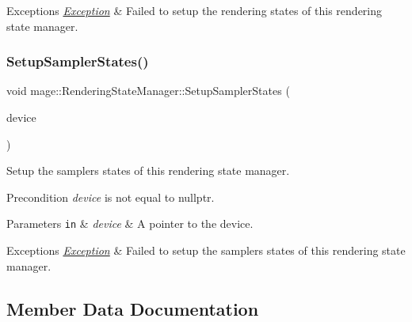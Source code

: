 \begin{DoxyExceptions}{Exceptions}
{\em \hyperlink{classmage_1_1_exception}{Exception}} & Failed to setup the rendering states of this rendering state manager. \\
\hline
\end{DoxyExceptions}
\hypertarget{classmage_1_1_rendering_state_manager_ae567fc70128f8fa58b2ac0b63b0c636f}{}\label{classmage_1_1_rendering_state_manager_ae567fc70128f8fa58b2ac0b63b0c636f} 
\subsubsection{\texorpdfstring{Setup\+Sampler\+States()}{SetupSamplerStates()}}
{\footnotesize\ttfamily void mage\+::\+Rendering\+State\+Manager\+::\+Setup\+Sampler\+States (\begin{DoxyParamCaption}\item[{I\+D3\+D11\+Device5 $\ast$}]{device }\end{DoxyParamCaption})\hspace{0.3cm}{\ttfamily [private]}}

Setup the samplers states of this rendering state manager.

\begin{DoxyPrecond}{Precondition}
{\itshape device} is not equal to {\ttfamily nullptr}. 
\end{DoxyPrecond}

\begin{DoxyParams}[1]{Parameters}
\mbox{\tt in}  & {\em device} & A pointer to the device. \\
\hline
\end{DoxyParams}

\begin{DoxyExceptions}{Exceptions}
{\em \hyperlink{classmage_1_1_exception}{Exception}} & Failed to setup the samplers states of this rendering state manager. \\
\hline
\end{DoxyExceptions}


\subsection{Member Data Documentation}
\hypertarget{classmage_1_1_rendering_state_manager_ad50dc7c990bf42580e511c55684e6630}{}\label{classmage_1_1_rendering_state_manager_ad50dc7c990bf42580e511c55684e6630} 
